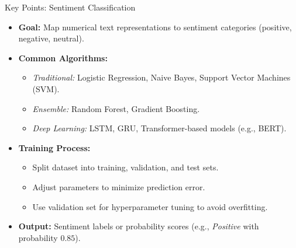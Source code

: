 \documentclass[aspectratio=169, table]{beamer}
\begin{document}
\begin{frame}{Key Points: Sentiment Classification}
	\vspace{20pt}
	\begin{itemize}
		\item \textbf{Goal:} Map numerical text representations to sentiment categories (positive, negative, neutral).
		\item \textbf{Common Algorithms:}
		\begin{itemize}
			\item \textit{Traditional:} Logistic Regression, Naive Bayes, Support Vector Machines (SVM).
			\item \textit{Ensemble:} Random Forest, Gradient Boosting.
			\item \textit{Deep Learning:} LSTM, GRU, Transformer-based models (e.g., BERT).
		\end{itemize}
		\item \textbf{Training Process:}
		\begin{itemize}
			\item Split dataset into training, validation, and test sets.
			\item Adjust parameters to minimize prediction error.
			\item Use validation set for hyperparameter tuning to avoid overfitting.
		\end{itemize}
		\item \textbf{Output:} Sentiment labels or probability scores 
		(e.g., \textit{Positive} with probability $0.85$).
	\end{itemize}
\end{frame}
\end{document}
